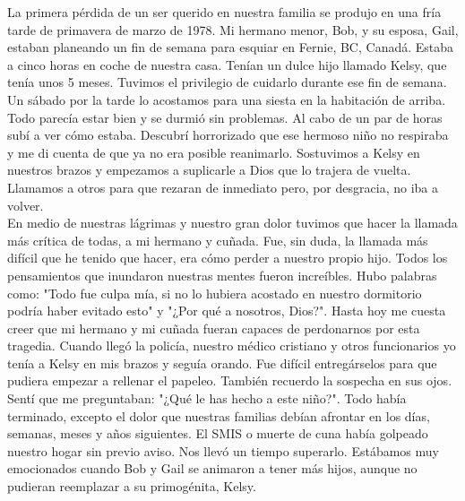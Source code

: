 \documentclass[twoside, 12pt]{book}
\begin{document}
La primera pérdida de un ser querido en nuestra familia se produjo en una fría tarde de primavera de marzo de 1978. Mi hermano menor, Bob, y su esposa, Gail, estaban planeando un fin de semana para esquiar en Fernie, BC, Canadá. Estaba a cinco horas en coche de nuestra casa. Tenían un dulce hijo llamado Kelsy, que tenía unos 5 meses. Tuvimos el privilegio de cuidarlo durante ese fin de semana. Un sábado por la tarde lo acostamos para una siesta en la habitación de arriba. Todo parecía estar bien y se durmió sin problemas. Al cabo de un par de horas subí a ver cómo estaba. Descubrí horrorizado que ese hermoso niño no respiraba y me di cuenta de que ya no era posible reanimarlo. Sostuvimos a Kelsy en nuestros brazos y empezamos a suplicarle a Dios que lo trajera de vuelta. Llamamos a otros para que rezaran de inmediato pero, por desgracia, no iba a volver.\\

En medio de nuestras lágrimas y nuestro gran dolor tuvimos que hacer la llamada más crítica de todas, a mi hermano y cuñada. Fue, sin duda, la llamada más difícil que he tenido que hacer, era cómo perder a nuestro propio hijo. Todos los pensamientos que inundaron nuestras mentes fueron increíbles. Hubo palabras como: "Todo fue culpa mía, si no lo hubiera acostado en nuestro dormitorio podría haber evitado esto" y "¿Por qué a nosotros, Dios?". Hasta hoy me cuesta creer que mi hermano y mi cuñada fueran capaces de perdonarnos por esta tragedia. Cuando llegó la policía, nuestro médico cristiano y otros funcionarios yo tenía a Kelsy en mis brazos y seguía orando. Fue difícil entregárselos para que pudiera empezar a rellenar el papeleo. También recuerdo la sospecha en sus ojos. Sentí que me preguntaban: "¿Qué le has hecho a este niño?". Todo había terminado, excepto el dolor que nuestras familias debían afrontar en los días, semanas, meses y años siguientes. El SMIS o muerte de cuna había golpeado nuestro hogar sin previo aviso. Nos llevó un tiempo superarlo. Estábamos muy emocionados cuando Bob y Gail se animaron a tener más hijos, aunque no pudieran reemplazar a su primogénita, Kelsy.\\
\end{document}
